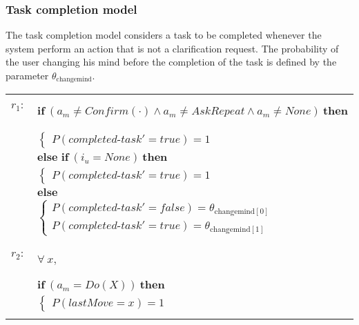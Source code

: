 \subsubsection*{Task completion model}

The task completion model considers a task to be completed whenever the system perform an action that is not a clarification request. The probability of the user changing his mind before the completion of the task is defined by the parameter $\theta_{\mathrm{changemind}}$. 

\begin{footnotesize}
\begin{longtable}{p{2cm}l}
$r_{1}$: \ \ & $ \textbf{if} \ (\mathit{a_m}\!\neq\!\mathit{Confirm(\cdot)} \land \mathit{a_m}\!\neq\!\mathit{AskRepeat} \land \mathit{a_m}\!\neq\!\mathit{None}) \ \textbf{then} $ \\
 & \;\;\;\;\; $ \begin{cases}P(\mathit{completed\mbox{-}task}'\!=\!\mathit{true})\!=\!1 \end{cases}$ \vspace{1mm} \\ & $ \textbf{else if} \ (\mathit{i_u}\!=\!\mathit{None}) \ \textbf{then}$ \\
& \;\;\;\;\; $ \begin{cases}P(\mathit{completed\mbox{-}task}'\!=\!\mathit{true})\!=\!1 \end{cases}$ \vspace{1mm} \\ & $ \textbf{else}$ \\
& \;\;\;\;\; $ \begin{cases}P(\mathit{completed\mbox{-}task}'\!=\!\mathit{false})\!=\!\theta_{\mathrm{changemind[0]}} \\
P(\mathit{completed\mbox{-}task}'\!=\!\mathit{true})\!=\!\theta_{\mathrm{changemind[1]}} \end{cases}$ \\ \\[-1mm]
$r_{2}$: \ \ & $ \forall \ x, $ \\ & $ \textbf{if} \ (\mathit{a_m}\!=\!\mathit{Do(X)}) \ \textbf{then} $ \\
 & \;\;\;\;\; $ \begin{cases}P(\mathit{lastMove}\!=\!\mathit{x})\!=\!1 \end{cases}$ \\ \\[-1mm]
\end{longtable}
\end{footnotesize}

